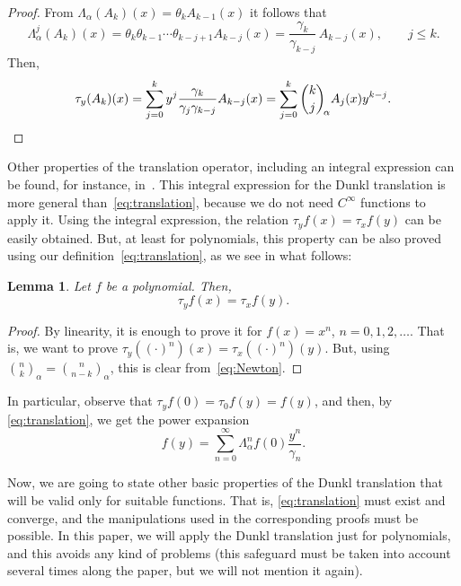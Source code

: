 \documentclass[10pt]{article}
\theoremstyle{plain}
\newtheorem{lemma}[theorem]{Lemma}
\theoremstyle{definition}
\numberwithin{equation}{section} %
\newcommand{\La}{\Lambda_{\alpha}}
\newcommand{\binoma}[2]{\binom{#1}{#2}_{\!\alpha}}
\newcommand{\cc}{\gamma}
\begin{document}
\begin{proof}
From $\La(A_k)(x) = \theta_k A_{k-1}(x)$ it follows that
\[
  \La^j(A_k)(x) = \theta_k \theta_{k-1} \cdots \theta_{k-j+1} A_{k-j}(x)
  = \frac{\cc_{k}}{\cc_{k-j}} \, A_{k-j}(x), \qquad j \le k.
\]
Then, 
\begin{equation*}
  \tau_y (A_k)(x) = 
  \sum_{j=0}^k y^j \frac{\cc_{k}}{\cc_{j}\cc_{k-j}} A_{k-j}(x)
  = \sum_{j=0}^k \binoma{k}{j} A_{j}(x) y^{k-j}.
\qedhere
\end{equation*}
\end{proof}

Other properties of the translation operator, including an integral expression
can be found, for instance, in~\cite{Ros}. 
This integral expression for the Dunkl translation is more general than~\eqref{eq:translation}, because we do not need $C^{\infty}$ functions to apply it. Using the integral expression, the relation $\tau_y f(x) = \tau_x f(y)$ can be easily obtained.
But, at least for polynomials, this property can be also proved using our definition~\eqref{eq:translation}, as we see in what follows:

\begin{lemma}
Let $f$ be a polynomial. Then, 
\begin{equation}
\label{eq:tyxtxy}
  \tau_y f(x) = \tau_x f(y).
\end{equation}
\end{lemma}

\begin{proof}
By linearity, it is enough to prove it for $f(x) = x^n$, $n=0,1,2,\dots$. That is, we want to prove $\tau_y ((\cdot)^n)(x) = \tau_x ((\cdot)^n)(y)$. But, using $\binoma{n}{k} = \binoma{n}{n-k}$, this is clear from~\eqref{eq:Newton}.
\end{proof}

In particular, observe that
$\tau_y f(0) = \tau_0 f(y) = f(y)$,
and then, by \eqref{eq:translation}, we get the power expansion
\[
  f(y) = \sum_{n=0}^\infty \La^{n}f(0) \frac{y^n}{\cc_{n}}.
\]

Now, we are going to state other basic properties of the Dunkl translation that will be valid only for suitable functions. That is, \eqref{eq:translation} must exist and converge, and the manipulations used in the corresponding proofs must be possible. In this paper, we will apply the Dunkl translation just for polynomials, and this avoids any kind of problems (this safeguard must be taken into account several times along the paper, but we will not mention it again). 
\end{document}
